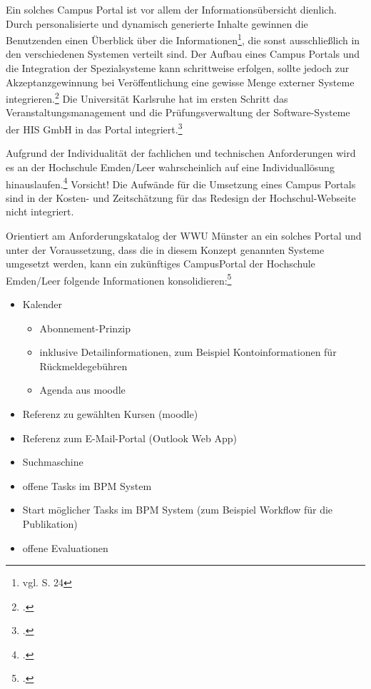 {{Ein solches Campus Portal ist vor allem der Informationsübersicht dienlich. Durch personalisierte und dynamisch generierte Inhalte gewinnen die Benutzenden einen Überblick über die Informationen\footnote{vgl. \cite{dini_webportale_2007} S. 24}, die sonst ausschließlich in den verschiedenen Systemen verteilt sind. Der Aufbau eines Campus Portals und die Integration der Spezialsysteme kann schrittweise erfolgen, sollte jedoch zur Akzeptanzgewinnung bei Veröffentlichung eine gewisse Menge externer Systeme integrieren.\footcite[Vgl.][17 f.]{dini_webportale_2007} Die Universität Karlsruhe hat im ersten Schritt das Veranstaltungsmanagement und die Prüfungsverwaltung der Software-Systeme der HIS GmbH in das Portal integriert.\footcite[Vgl.][40 f.]{dini_webportale_2007}

Aufgrund der Individualität der fachlichen und technischen Anforderungen wird es an der Hochschule Emden/Leer wahrscheinlich auf eine Individuallösung hinauslaufen.\footcite[Vgl.][21]{dini_webportale_2007} Vorsicht! Die Aufwände für die Umsetzung eines Campus Portals sind in der Kosten- und Zeitschätzung für das Redesign der Hochschul-Webseite nicht integriert.

Orientiert am Anforderungskatalog der WWU Münster an ein solches Portal und unter der Voraussetzung, dass die in diesem Konzept genannten Systeme umgesetzt werden, kann ein zukünftiges CampusPortal der Hochschule Emden/Leer folgende Informationen konsolidieren:\footcite[Vgl.][158 ff.]{vogl_fortschritte_2012}

\begin{itemize}
	\item Kalender
	\begin{itemize}
		\item Abonnement-Prinzip
		\item inklusive Detailinformationen, zum Beispiel Kontoinformationen für Rückmeldegebühren
		\item Agenda aus moodle
	\end{itemize}
	\item Referenz zu gewählten Kursen (moodle)
	\item Referenz zum E-Mail-Portal (Outlook Web App)
	\item Suchmaschine
	\item offene Tasks im BPM System
	\item Start möglicher Tasks im BPM System (zum Beispiel Workflow für die Publikation)
	\item offene Evaluationen
\end{itemize}

}}
